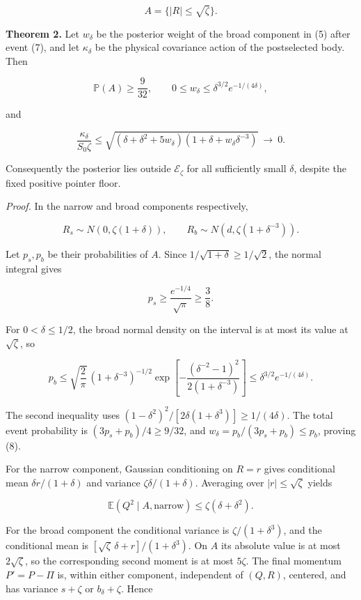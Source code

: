\documentclass[11pt,a4paper]{article}
\begin{document}
\[ A=\{|R|\le\sqrt\zeta\}. \tag{7}\]

\textbf{Theorem 2.} Let \(w_\delta\) be the posterior weight of the
broad component in (5) after event (7), and let \(\kappa_\delta\) be the
physical covariance action of the postselected body. Then

\[
 \mathbb P(A)\ge\frac9{32},\qquad
 0\le w_\delta\le\delta^{3/2}e^{-1/(4\delta)}, \tag{8}
\]

and

\[
 \frac{\kappa_\delta}{S_0\zeta}\le
 \sqrt{(\delta+\delta^2+5w_\delta)
              (1+\delta+w_\delta\delta^{-3})}
 \ \longrightarrow\ 0. \tag{9}
\]

Consequently the posterior lies outside \(\mathcal E_\zeta\) for all
sufficiently small \(\delta\), despite the fixed positive pointer floor.

\emph{Proof.} In the narrow and broad components respectively,

\[
 R_s\sim N(0,\zeta(1+\delta)),\qquad
 R_b\sim N(d,\zeta(1+\delta^{-3})). \tag{10}
\]

Let \(p_s,p_b\) be their probabilities of \(A\). Since
\(1/\sqrt{1+\delta}\ge1/\sqrt2\), the normal integral gives

\[p_s\ge \frac{e^{-1/4}}{\sqrt\pi}\ge\frac38.\tag{11}\]

For \(0<\delta\le1/2\), the broad normal density on the interval is at
most its value at \(\sqrt\zeta\), so

\[
 p_b\le\sqrt{\frac2\pi}\,(1+\delta^{-3})^{-1/2}
 \exp\!\left[-\frac{(\delta^{-2}-1)^2}{2(1+\delta^{-3})}\right]
 \le\delta^{3/2}e^{-1/(4\delta)}. \tag{12}
\]

The second inequality uses
\((1-\delta^2)^2/[2\delta(1+\delta^3)]\ge1/(4\delta)\). The total event
probability is \((3p_s+p_b)/4\ge9/32\), and
\(w_\delta=p_b/(3p_s+p_b)\le p_b\), proving (8).

For the narrow component, Gaussian conditioning on \(R=r\) gives
conditional mean \(\delta r/(1+\delta)\) and variance
\(\zeta\delta/(1+\delta)\). Averaging over \(|r|\le\sqrt\zeta\) yields

\[\mathbb E(Q^2\mid A,\text{narrow})\le\zeta(\delta+\delta^2).\tag{13}\]

For the broad component the conditional variance is
\(\zeta/(1+\delta^3)\), and the conditional mean is
\([\sqrt\zeta\,\delta+r]/(1+\delta^3)\). On \(A\) its absolute value is
at most \(2\sqrt\zeta\), so the corresponding second moment is at most
\(5\zeta\). The final momentum \(P'=P-\Pi\) is, within either component,
independent of \((Q,R)\), centered, and has variance \(s+\zeta\) or
\(b_\delta+\zeta\). Hence
\end{document}

